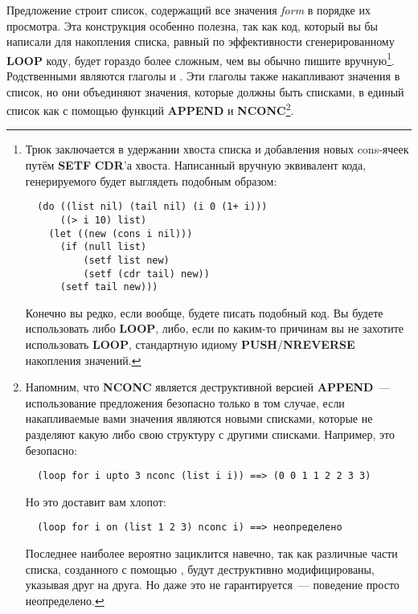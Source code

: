 Предложение  строит список, содержащий все значения \textit{form} в порядке
их просмотра. Эта конструкция особенно полезна, так как код, который вы бы написали для
накопления списка, равный по эффективности сгенерированному \textbf{LOOP} коду, будет
гораздо более сложным, чем вы обычно пишите вручную\footnote{Трюк заключается в удержании
  хвоста списка и добавления новых cons-ячеек путём \textbf{SETF} \textbf{CDR}'а
  хвоста. Написанный вручную эквивалент кода, генерируемого  будет выглядеть подобным образом:

\begin{lstlisting}
  (do ((list nil) (tail nil) (i 0 (1+ i)))
      ((> i 10) list)
    (let ((new (cons i nil)))
      (if (null list)
          (setf list new)
          (setf (cdr tail) new))
      (setf tail new)))
\end{lstlisting}

Конечно вы редко, если вообще, будете писать подобный код. Вы будете использовать либо
\textbf{LOOP}, либо, если по каким-то причинам вы не захотите использовать \textbf{LOOP},
стандартную идиому \textbf{PUSH}/\textbf{NREVERSE} накопления значений.}. Родственными
 являются глаголы  и .  Эти глаголы также
накапливают значения в список, но они объединяют значения, которые должны быть списками, в
единый список как с помощью функций \textbf{APPEND} и \textbf{NCONC}\footnote{Напомним,
  что \textbf{NCONC} является деструктивной версией \textbf{APPEND}~--- использование
  предложения  безопасно только в том случае, если накапливаемые вами значения
  являются новыми списками, которые не разделяют какую либо свою структуру с другими
  списками. Например, это безопасно:

\begin{lstlisting}
  (loop for i upto 3 nconc (list i i)) ==> (0 0 1 1 2 2 3 3)
\end{lstlisting}

Но это доставит вам хлопот:

\begin{lstlisting}
  (loop for i on (list 1 2 3) nconc i) ==> неопределено
\end{lstlisting}

Последнее наиболее вероятно зациклится навечно, так как различные части списка, созданного
с помощью , будут деструктивно модифицированы, указывая друг на
друга. Но даже это не гарантируется~--- поведение просто неопределено.}.

